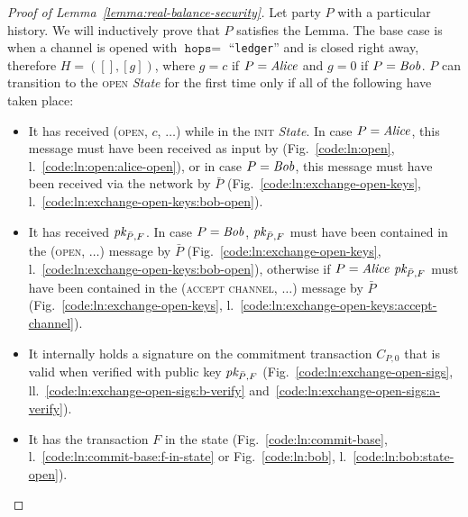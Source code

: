 \begin{proof}[Proof of Lemma~\ref{lemma:real-balance-security}]
  Let party $P$ with a particular history. We will inductively prove that $P$
  satisfies the Lemma. The base case is when a channel is opened with
  $\texttt{hops} =$ ``\texttt{ledger}'' and is closed right away, therefore $H =
  ([], [g])$, where $g = c$ if $P = \mathit{Alice}$ and $g = 0$ if $P = \mathit{Bob}$.  $P$ can
  transition to the \textsc{open} \textit{State} for the first time only if all
  of the following have taken place:
  \begin{itemize}
    \item It has received (\textsc{open}, $c$, $\dots$) while in the
    \textsc{init} \textit{State}. In case $P = \mathit{Alice}$, this message must have
    been received as input by \environment (Fig.~\ref{code:ln:open},
    l.~\ref{code:ln:open:alice-open}), or in case $P = \mathit{Bob}$, this message must
    have been received via the network by $\bar{P}$
    (Fig.~\ref{code:ln:exchange-open-keys},
    l.~\ref{code:ln:exchange-open-keys:bob-open}).
    \item It has received $\textit{pk}_{\bar{P}, F}$. In case $P = \mathit{Bob}$, $\textit{pk}_{\bar{P},
    F}$ must have been contained in the (\textsc{open}, $\dots$) message by
    $\bar{P}$ (Fig.~\ref{code:ln:exchange-open-keys},
    l.~\ref{code:ln:exchange-open-keys:bob-open}), otherwise if $P = \mathit{Alice}$
    $\textit{pk}_{\bar{P}, F}$ must have been contained in the (\textsc{accept channel},
    $\dots$) message by $\bar{P}$ (Fig.~\ref{code:ln:exchange-open-keys},
    l.~\ref{code:ln:exchange-open-keys:accept-channel}).
    \item It internally holds a signature on the commitment transaction $C_{P,
    0}$ that is valid when verified with public key $\textit{pk}_{\bar{P}, F}$
    (Fig.~\ref{code:ln:exchange-open-sigs},
    ll.~\ref{code:ln:exchange-open-sigs:b-verify}
    and~\ref{code:ln:exchange-open-sigs:a-verify}).
    \item It has the transaction $F$ in the \ledger state
    (Fig.~\ref{code:ln:commit-base}, l.~\ref{code:ln:commit-base:f-in-state} or
    Fig.~\ref{code:ln:bob}, l.~\ref{code:ln:bob:state-open}).
  \end{itemize}


\end{proof}
